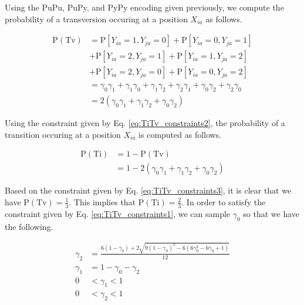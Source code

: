 \documentclass[10pt,letterpaper]{article}\usepackage[]{graphicx}\usepackage[]{color}
\begin{document}
Using the PuPu, PuPy, and PyPy encoding given previously, we compute the probability of a transversion occuring at a position $X_{ia}$ as follows.

\begin{equation}\label{eq:prob_Tv}
\begin{aligned}
\text{P}(\text{Tv}) &= \text{P}\left[Y_{ia} = 1, Y_{ja} = 0\right] + \text{P}\left[Y_{ia} = 0, Y_{ja} = 1\right] \\
&+ \text{P}\left[Y_{ia} = 2, Y_{ja} = 1\right] + \text{P}\left[Y_{ia} = 1, Y_{ja} = 2\right] \\
&+ \text{P}\left[Y_{ia} = 2, Y_{ja} = 0\right] + \text{P}\left[Y_{ia} = 0, Y_{ja} = 2\right] \\
&= \gamma_0 \gamma_1 + \gamma_1 \gamma_0 + \gamma_1 \gamma_2 + \gamma_2 \gamma_1 + \gamma_0 \gamma_2 + \gamma_2 \gamma_0 \\
&= 2(\gamma_0 \gamma_1 + \gamma_1 \gamma_2 + \gamma_0 \gamma_2)
\end{aligned}
\end{equation}

Using the constraint given by Eq. \ref{eq:TiTv_constraints2}, the probability of a transition occuring at a position $X_{ia}$ is computed as follows.

\begin{equation}\label{eq:prob_Ti}
\begin{aligned}
\text{P}(\text{Ti}) &= 1 - \text{P}(\text{Tv}) \\
&= 1 - 2(\gamma_0 \gamma_1 + \gamma_1 \gamma_2 + \gamma_0 \gamma_2)
\end{aligned}
\end{equation}

Based on the constraint given by Eq. \ref{eq:TiTv_constraints3}, it is clear that we have $\text{P}(\text{Tv}) = \frac{1}{3}$. This implies that $\text{P}(\text{Ti}) = \frac{2}{3}$. In order to satisfy the constraint given by Eq. \ref{eq:TiTv_constraints1}, we can sample $\gamma_0$ so that we have the following.

\begin{equation}\label{eq:gammas}
\begin{aligned}
\gamma_2 &= \frac{6(1 - \gamma_0) + 2 \sqrt{9(1 - \gamma_0)^2 - 6(6 \gamma^2_0 - 6 \gamma_0 + 1)}}{12} \\
\gamma_1 &= 1 - \gamma_0 - \gamma_2 \\
0 &< \gamma_1 < 1 \\
0 &< \gamma_2 < 1
\end{aligned}
\end{equation}
\end{document}
